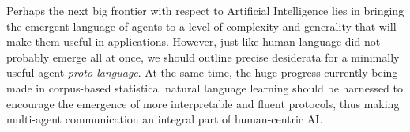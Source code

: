 Perhaps the next big frontier with respect to
Artificial Intelligence lies in bringing the emergent language of agents to a
level of complexity and generality that will make them useful in applications.
However, just like human language did not probably emerge all at once,
we should outline precise desiderata for a minimally useful agent
\emph{proto-language}. At the same time, the huge progress currently being made
in corpus-based statistical natural language learning should be harnessed
to encourage the emergence of more interpretable and fluent protocols, thus
making multi-agent communication an integral part of human-centric AI. 





